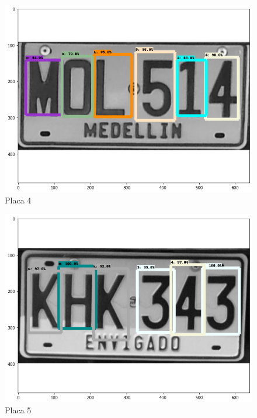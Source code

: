 \begin{figure}[H]
\centering
\includegraphics[width=0.4\linewidth]{imagenes/caracteres detectados/5.png}
\caption{Placa 4}
\label{fig:caracteres detectados p5}
\end{figure}

\begin{table}[H]
    \centering
    \caption{Detección de caracteres con porcentajes de acierto placa 4}
    \label{tab:p5}
\end{table}


\begin{figure}[H]
\centering
\includegraphics[width=0.4\linewidth]{imagenes/caracteres detectados/nuevo entrenamiento/25.png}
\caption{Placa 5}
\label{fig:caracteres detectados p6}
\end{figure}

